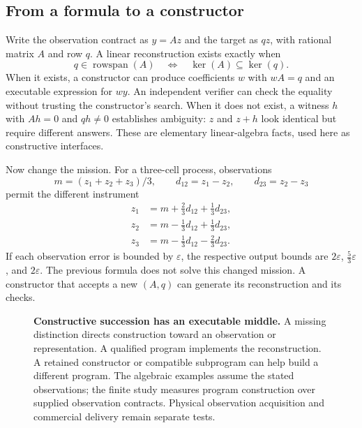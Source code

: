 \documentclass[10pt,a4paper]{article}
\begin{document}
\subsection{From a formula to a constructor}

Write the observation contract as $y=Az$ and the target as $qz$, with rational matrix $A$ and row $q$. A linear reconstruction exists exactly when
\begin{equation}
 q\in\operatorname{rowspan}(A)
 \quad\Longleftrightarrow\quad
 \ker(A)\subseteq\ker(q).
\label{eq:identifiability}
\end{equation}
When it exists, a constructor can produce coefficients $w$ with $wA=q$ and an executable expression for $wy$. An independent verifier can check the equality without trusting the constructor's search. When it does not exist, a witness $h$ with $Ah=0$ and $qh\ne0$ establishes ambiguity: $z$ and $z+h$ look identical but require different answers. These are elementary linear-algebra facts, used here as constructive interfaces.

Now change the mission. For a three-cell process, observations
\[
 m=(z_1+z_2+z_3)/3,\qquad d_{12}=z_1-z_2,\qquad d_{23}=z_2-z_3
\]
permit the different instrument
\begin{equation}
\begin{aligned}
 z_1&=m+\tfrac23d_{12}+\tfrac13d_{23},\\
 z_2&=m-\tfrac13d_{12}+\tfrac13d_{23},\\
 z_3&=m-\tfrac13d_{12}-\tfrac23d_{23}.
\end{aligned}
\label{eq:three}
\end{equation}
If each observation error is bounded by $\varepsilon$, the respective output bounds are $2\varepsilon$, $\frac53\varepsilon$, and $2\varepsilon$. The previous formula does not solve this changed mission. A constructor that accepts a new $(A,q)$ can generate its reconstruction and its checks.

\begin{figure}[htbp]
\centering

\caption{\textbf{Constructive succession has an executable middle.} A missing distinction directs construction toward an observation or representation. A qualified program implements the reconstruction. A retained constructor or compatible subprogram can help build a different program. The algebraic examples assume the stated observations; the finite study measures program construction over supplied observation contracts. Physical observation acquisition and commercial delivery remain separate tests.}
\label{fig:measurement}
\end{figure}
\end{document}
